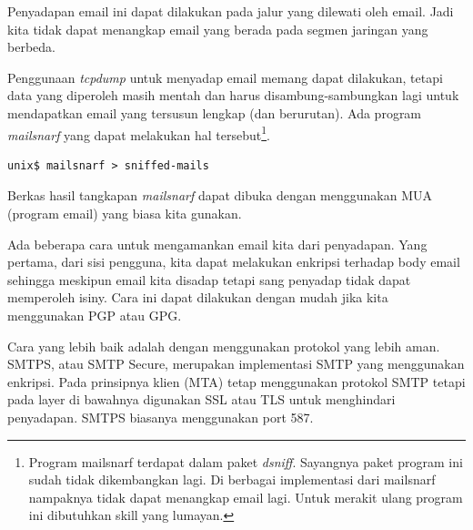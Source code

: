 Penyadapan email ini dapat dilakukan pada jalur yang dilewati oleh email. Jadi
kita tidak dapat menangkap email yang berada pada segmen jaringan yang berbeda.

Penggunaan {\em tcpdump} untuk menyadap email memang dapat dilakukan, tetapi
data yang diperoleh masih mentah dan harus disambung-sambungkan lagi untuk
mendapatkan email yang tersusun lengkap (dan berurutan). Ada program {\em
mailsnarf} yang dapat melakukan hal tersebut\footnote{Program mailsnarf
terdapat dalam paket {\em dsniff}. Sayangnya paket program ini sudah tidak
dikembangkan lagi. Di berbagai implementasi dari mailsnarf nampaknya tidak
dapat menangkap email lagi. Untuk merakit ulang program ini dibutuhkan skill
yang lumayan.}.

\begin{verbatim}
unix$ mailsnarf > sniffed-mails
\end{verbatim}

Berkas hasil tangkapan {\em mailsnarf} dapat dibuka dengan menggunakan MUA
(program email) yang biasa kita gunakan.

Ada beberapa cara untuk mengamankan email kita dari penyadapan. Yang pertama,
dari sisi pengguna, kita dapat melakukan enkripsi terhadap body email sehingga
meskipun email kita disadap tetapi sang penyadap tidak dapat memperoleh isiny.
Cara ini dapat dilakukan dengan mudah jika kita menggunakan PGP atau GPG.

Cara yang lebih baik adalah dengan menggunakan protokol yang lebih aman. SMTPS,
atau SMTP Secure, merupakan implementasi SMTP yang menggunakan enkripsi. Pada
prinsipnya klien (MTA) tetap menggunakan protokol SMTP tetapi pada layer di
bawahnya digunakan SSL atau TLS untuk menghindari penyadapan. SMTPS biasanya
menggunakan port 587.
